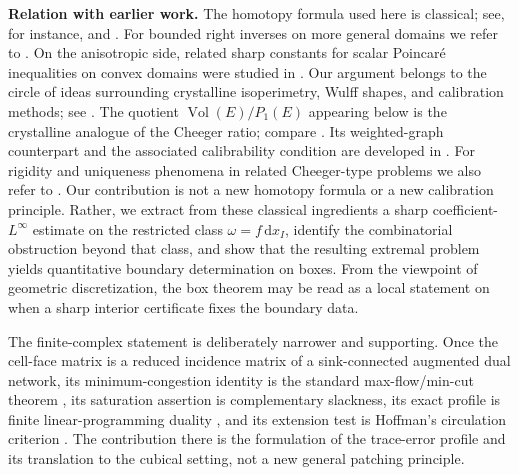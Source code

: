 \documentclass[11pt,letterpaper]{article}
\numberwithin{equation}{section}
\theoremstyle{plain}
\theoremstyle{definition}
\theoremstyle{remark}
\newcommand{\dd}{\mathrm{d}}
\DeclareMathOperator{\Vol}{Vol}
\begin{document}
\medskip
\noindent\textbf{Relation with earlier work.}
The homotopy formula used here is classical; see, for instance,
\cite[section~3]{BottTu1982} and
\cite{Whitney1957,Dodziuk1976,Dupont1976,DupontBook1978,Albert2020,
ArnoldFalkWinther2010,ArnoldAwanou2014}. For bounded right inverses on more
general domains we refer to
\cite{Bogovskii1979,IwaniecLutoborski1993,CostabelMcIntosh2010,
GuzmanSalgado2021,ChaumontFreletLichtVohralik2025}. On the anisotropic side,
related sharp constants for scalar Poincar\'e inequalities on convex domains
were studied in \cite{PayneWeinberger1960,AcostaDuran2004}. Our argument
belongs to the circle of ideas surrounding crystalline isoperimetry, Wulff
shapes, and calibration methods; see
\cite{Taylor1978,Fonseca1991,FonsecaMuller1991,DacorognaPfister1992,
FigalliZhang2022,DeMason2024,Strang1983,Nozawa1990,Grieser2006,Strang2010,
CasellesFaccioloMeinhardt2009,CasellesChambolleMollNovaga2008,Leonardi2015}.
The quotient $\Vol(E)/P_1(E)$ appearing below is the crystalline analogue of
the Cheeger ratio; compare
\cite{Cheeger1970,Leonardi2015,Parini2011}. Its weighted-graph counterpart and
the associated calibrability condition are developed in
\cite{MazonSoleraToledo2020}. For rigidity and uniqueness
phenomena in related Cheeger-type problems we also refer to
\cite{CasellesChambolleNovaga2007,CasellesChambolleNovaga2011}.
Our contribution is not a new homotopy formula or a new calibration
principle. Rather, we extract from these classical ingredients a sharp
coefficient-$L^\infty$ estimate on the restricted class $\omega=f\,\dd x_I$,
identify the combinatorial obstruction beyond that class, and show that the
resulting extremal problem yields quantitative boundary determination on
boxes. From the viewpoint of geometric discretization, the box theorem may be
read as a local statement on when a sharp interior certificate fixes the
boundary data.

The finite-complex statement is deliberately narrower and supporting. Once
the cell-face matrix is a reduced incidence matrix of a sink-connected
augmented dual network, its minimum-congestion identity is the standard
max-flow/min-cut theorem \cite{Nozawa1990,Grieser2006,Strang2010}, its saturation
assertion is complementary slackness, its exact profile is finite
linear-programming duality \cite{BachemKern1992}, and its extension test is
Hoffman's circulation criterion \cite{Hoffman1960}. The contribution there is
the formulation of the trace-error profile and its translation to the
cubical setting, not a new general patching principle.
\end{document}
